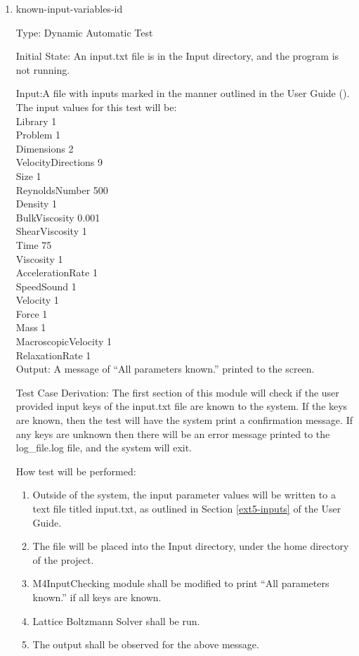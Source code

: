 \documentclass[12pt, titlepage]{article}
\newcommand{\myprogname}{Lattice Boltzmann Solver}
\newcounter{uvtestcounter} %
\begin{document}
\begin{enumerate}
	
	\item{known-input-variables-id\theuvtestcounter\\}
	
	Type: Dynamic Automatic Test

	Initial State: An input.txt file is in the Input directory, and the program is not running.

	Input:A file with inputs marked in the manner outlined in the
User Guide (\citet{LBM_UserGuide_PM}).\\The input values for this test will
be:\\

Library 1\\
Problem 1\\
Dimensions 2\\
VelocityDirections 9\\
Size 1\\
ReynoldsNumber 500\\
Density 1\\
BulkViscosity 0.001\\
ShearViscosity 1\\
Time 75\\
Viscosity 1\\
AccelerationRate 1\\
SpeedSound 1\\
Velocity 1\\
Force 1\\
Mass 1\\
MacroscopicVelocity 1\\
RelaxationRate 1\\

Output: A message of ``All parameters known.'' printed to the screen.

Test Case Derivation:  The first section of this module will check if the user provided input keys of the input.txt file are known to the system. If the keys are known, then the test will have the system print a confirmation message. If any keys are unknown then there will be an error message printed to the log\_file.log file, and the system will exit.  

How test will be performed: 
\begin{enumerate}
	\item Outside of the system, the input parameter values will be written to a text file titled input.txt, as outlined in Section \ref{ext5-inputs} of the User Guide.
	\item The file will be placed into the Input directory, under the home directory of the project.
	\item M4InputChecking module shall be modified to print ``All parameters known.'' if all keys are known.
	\item {\myprogname} shall be run. 
	\item The output shall be observed for the above message.
\end{enumerate}
	

\end{enumerate}
\end{document}
